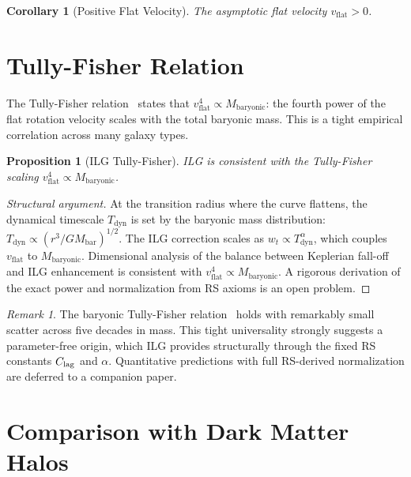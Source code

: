 \documentclass[12pt,a4paper]{article}
\newtheorem{corollary}[theorem]{Corollary}
\newtheorem{proposition}[theorem]{Proposition}
\theoremstyle{definition}
\theoremstyle{remark}
\newtheorem{remark}[theorem]{Remark}
\begin{document}
\begin{corollary}[Positive Flat Velocity]
\label{cor:positive}
The asymptotic flat velocity $v_{\mathrm{flat}} > 0$.
\end{corollary}

\section{Tully-Fisher Relation}
\label{sec:tully-fisher}

The Tully-Fisher relation~\cite{McGaugh2012} states that
$v_{\mathrm{flat}}^4 \propto M_{\mathrm{baryonic}}$: the fourth power
of the flat rotation velocity scales with the total baryonic mass.
This is a tight empirical correlation across many galaxy types.

\begin{proposition}[ILG Tully-Fisher]
\label{prop:tf}
ILG is consistent with the Tully-Fisher scaling
$v_{\mathrm{flat}}^4 \propto M_{\mathrm{baryonic}}$.
\end{proposition}

\begin{proof}[Structural argument]
At the transition radius where the curve flattens, the dynamical
timescale $T_{\mathrm{dyn}}$ is set by the baryonic mass distribution:
$T_{\mathrm{dyn}} \propto (r^3/GM_{\mathrm{bar}})^{1/2}$.  The ILG
correction scales as $w_t \propto T_{\mathrm{dyn}}^\alpha$, which
couples $v_{\mathrm{flat}}$ to $M_{\mathrm{baryonic}}$.  Dimensional
analysis of the balance between Keplerian fall-off and ILG enhancement
is consistent with $v_{\mathrm{flat}}^4 \propto M_{\mathrm{baryonic}}$.
A rigorous derivation of the exact power and normalization from
RS axioms is an open problem.
\end{proof}

\begin{remark}
The baryonic Tully-Fisher relation~\cite{McGaugh2012} holds with
remarkably small scatter across five decades in mass.  This tight
universality strongly suggests a parameter-free origin, which ILG
provides structurally through the fixed RS constants $C_{\rm lag}$
and $\alpha$.  Quantitative predictions with full RS-derived
normalization are deferred to a companion paper.
\end{remark}

\section{Comparison with Dark Matter Halos}
\label{sec:cdm}
\end{document}
